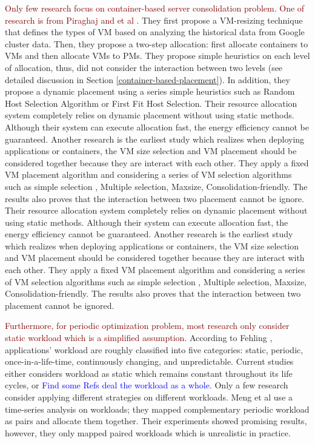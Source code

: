 \textcolor{Maroon}{Only few research focus on container-based server consolidation problem. One of research is from Piraghaj and et al \cite{Piraghaj:2015uf}.} They first propose a VM-resizing technique that defines the types of VM based on analyzing the historical data from Google cluster data. Then, they propose a two-step allocation: first allocate containers to VMs and then allocate VMs to PMs. They propose simple heuristics on each level of allocation, thus, did not consider the interaction between two levels (see detailed discussion in Section \ref{container-based-placement}). In addition, they propose a dynamic placement \cite{Piraghaj:2016bw} using a series simple heuristics such as Random Host Selection Algorithm or First Fit Host Selection. Their resource allocation system completely relies on dynamic placement without using static methods. Although their system can execute allocation fast, the energy efficiency cannot be guaranteed. Another research  \cite{Mann:2016hx} is the earliest study which realizes when deploying applications or containers, the VM size selection and VM placement should be considered together because they are interact with each other. They apply a fixed VM placement algorithm and considering a series of VM selection algorithms such as simple selection \cite{Ganesan:2012eb},  Multiple selection, Maxsize, Consolidation-friendly. The results also proves that the interaction between two placement cannot be ignore. Their resource allocation system completely relies on dynamic placement without using static methods. Although their system can execute allocation fast, the energy efficiency cannot be guaranteed. Another research  \cite{Mann:2016hx} is the earliest study which realizes when deploying applications or containers, the VM size selection and VM placement should be considered together because they are interact with each other. They apply a fixed VM placement algorithm and considering a series of VM selection algorithms such as simple selection \cite{Ganesan:2012eb},  Multiple selection, Maxsize, Consolidation-friendly. The results also proves that the interaction between two placement cannot be ignored.

\textcolor{Maroon}{Furthermore, for periodic optimization problem, most research only consider static workload \cite{} which is a simplified assumption.} According to Fehling \cite{Fehling:2014tl}, applications' workload are roughly classified into five categories: static, periodic, once-in-a-life-time, continuously changing, and unpredictable. Current studies either considers workload as static which remains constant throughout its life cycles, or \textcolor{blue}{Find some Refs deal the workload as a whole.} Only a few research consider applying different strategies on different workloads. Meng et al \cite{Meng:2010gh} use a time-series analysis on workloads; they mapped complementary periodic workload as pairs and allocate them together. Their experiments showed promising results, however, they only mapped paired workloads which is unrealistic in practice.

